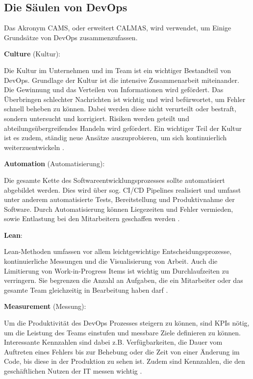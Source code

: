\subsection{Die Säulen von DevOps}

Das Akronym \ac{CAMS}, oder erweitert \ac{CALMAS}, wird verwendet, um
Einige Grundsätze von DevOps zusammenzufassen.

\textbf{Culture} (Kultur):

Die Kultur im Unternehmen und im Team ist ein wichtiger Bestandteil von DevOps.
Grundlage der Kultur ist die intensive Zusammenarbeit miteinander.
Die Gewinnung und das Verteilen von Informationen wird gefördert. Das Überbringen
schlechter Nachrichten ist wichtig und wird befürwortet, um Fehler schnell beheben
zu können. Dabei werden diese nicht verurteilt oder bestraft, sondern untersucht und
korrigiert. Risiken werden geteilt und abteilungsübergreifendes Handeln wird gefördert.
Ein wichtiger Teil der Kultur ist es zudem, ständig neue Ansätze auszuprobieren,
um sich kontinuierlich weiterzuentwickeln \cite{Halstenberg2020}.

\textbf{Automation} (Automatisierung):

Die gesamte Kette des Softwareentwicklungsprozesses sollte automatisiert abgebildet werden.
Dies wird über sog. \ac{CI/CD} Pipelines realisiert und umfasst unter anderem 
automatisierte Tests, Bereitstellung und Produktivnahme der Software.
Durch Automatisierung können Liegezeiten und Fehler vermieden, sowie
Entlastung bei den Mitarbeitern geschaffen werden \cite{Alt2017}\cite{Halstenberg2020}.

\textbf{Lean}:

Lean-Methoden umfassen vor allem leichtgewichtige Entscheidungsprozesse, kontinuierliche
Messungen und die Visualisierung von Arbeit.
Auch die Limitierung von Work-in-Progress Items ist wichtig um Durchlaufzeiten zu verringern.
Sie begrenzen die Anzahl an Aufgaben, die ein Mitarbeiter oder das gesamte Team
gleichzeitig in Bearbeitung haben darf \cite{Halstenberg2020}.

\textbf{Measurement} (Messung):

Um die Produktivität des DevOps Prozesses steigern zu können, sind \acp{KPI} nötig,
um die Leistung des Teams einstufen und messbare Ziele definieren zu können.
Interessante Kennzahlen sind dabei z.B. Verfügbarkeiten, die Dauer vom Auftreten
eines Fehlers bis zur Behebung oder die Zeit von einer Änderung im Code, bis diese in
der Produktion zu sehen ist.
Zudem sind Kennzahlen, die den geschäftlichen Nutzen der IT messen wichtig \cite{Halstenberg2020}.

